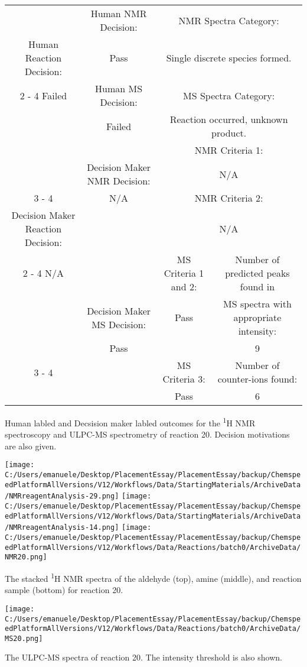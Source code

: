 \documentclass{article}%
\begin{document}
\begin{Decision Table}[H]%
\begin{tabular}{|c|c|c|c|}%
\hline%
&Human NMR Decision:&\multicolumn{2}{|c|}{NMR Spectra Category:}\\%
Human Reaction Decision:&Pass&\multicolumn{2}{|c|}{Single discrete species formed.}\\%
\cline{2%
-%
4}%
Failed&Human MS Decision:&\multicolumn{2}{|c|}{MS Spectra Category:}\\%
&Failed&\multicolumn{2}{|c|}{Reaction occurred, unknown product.}\\%
\hline%
&&\multicolumn{2}{|c|}{NMR Criteria 1:}\\%
&Decision Maker NMR Decision:&\multicolumn{2}{|c|}{N/A}\\%
\cline{3%
-%
4}%
&N/A&\multicolumn{2}{|c|}{NMR Criteria 2:}\\%
Decision Maker Reaction Decision:&&\multicolumn{2}{|c|}{N/A}\\%
\cline{2%
-%
4}%
N/A&&MS Criteria 1 and 2:&Number of predicted peaks found in\\%
&Decision Maker MS Decision:&Pass&MS spectra with appropriate intensity:\\%
&Pass&&9\\%
\cline{3%
-%
4}%
&&MS Criteria 3:&Number of counter{-}ions found:\\%
&&Pass&6\\%
\hline%
\end{tabular}%
\caption{Human labled and Decsision maker labled outcomes for the \textsuperscript{1}H NMR spectroscopy and ULPC-MS spectrometry of reaction 20. Decision motivations are also given.}%
\end{Decision Table}%
\begin{NMR Spectra}[H]%
\begin{center}%
\texttt{[image: C:/Users/emanuele/Desktop/PlacementEssay/PlacementEssay/backup/ChemspeedPlatformAllVersions/V12/Workflows/Data/StartingMaterials/ArchiveData/NMRreagentAnalysis-29.png]}\hfill%
\texttt{[image: C:/Users/emanuele/Desktop/PlacementEssay/PlacementEssay/backup/ChemspeedPlatformAllVersions/V12/Workflows/Data/StartingMaterials/ArchiveData/NMRreagentAnalysis-14.png]}\hfill%
\texttt{[image: C:/Users/emanuele/Desktop/PlacementEssay/PlacementEssay/backup/ChemspeedPlatformAllVersions/V12/Workflows/Data/Reactions/batch0/ArchiveData/NMR20.png]}\hfill%
\end{center}%
\caption{The stacked \textsuperscript{1}H NMR spectra of the aldehyde (top), amine (middle), and reaction sample (bottom) for reaction 20.}%
\end{NMR Spectra}%
\begin{MS Spectra}[H]%
\begin{center}%
\texttt{[image: C:/Users/emanuele/Desktop/PlacementEssay/PlacementEssay/backup/ChemspeedPlatformAllVersions/V12/Workflows/Data/Reactions/batch0/ArchiveData/MS20.png]}\hfill%
\end{center}%
\caption{The ULPC-MS spectra of reaction 20. The intensity threshold is also shown.}%
\end{MS Spectra}%
\end{document}
